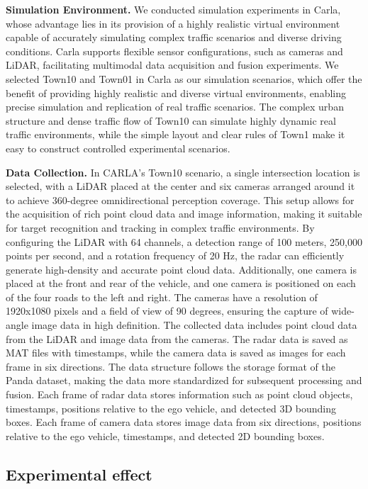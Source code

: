 \textbf{Simulation Environment.}
We conducted simulation experiments in Carla, whose advantage lies in its provision of a highly realistic virtual environment capable of accurately simulating complex traffic scenarios and diverse driving conditions. 
Carla supports flexible sensor configurations, such as cameras and LiDAR, facilitating multimodal data acquisition and fusion experiments\cite{Alpher22e}. 
We selected Town10 and Town01 in Carla as our simulation scenarios, which offer the benefit of providing highly realistic and diverse virtual environments, enabling precise simulation and replication of real traffic scenarios. 
The complex urban structure and dense traffic flow of Town10 can simulate highly dynamic real traffic environments, while the simple layout and clear rules of Town1 make it easy to construct controlled experimental scenarios.

\textbf{Data Collection.}
In CARLA's Town10 scenario, a single intersection location is selected, with a LiDAR placed at the center and six cameras arranged around it to achieve 360-degree omnidirectional perception coverage. 
This setup allows for the acquisition of rich point cloud data and image information, making it suitable for target recognition and tracking in complex traffic environments. 
By configuring the LiDAR with 64 channels, a detection range of 100 meters, 250,000 points per second, and a rotation frequency of 20 Hz, the radar can efficiently generate high-density and accurate point cloud data. 
Additionally, one camera is placed at the front and rear of the vehicle, and one camera is positioned on each of the four roads to the left and right. 
The cameras have a resolution of 1920x1080 pixels and a field of view of 90 degrees, ensuring the capture of wide-angle image data in high definition. 
The collected data includes point cloud data from the LiDAR and image data from the cameras. 
The radar data is saved as MAT files with timestamps, while the camera data is saved as images for each frame in six directions. 
The data structure follows the storage format of the Panda dataset, making the data more standardized for subsequent processing and fusion\cite{Alpher21c}. 
Each frame of radar data stores information such as point cloud objects, timestamps, positions relative to the ego vehicle, and detected 3D bounding boxes. 
Each frame of camera data stores image data from six directions, positions relative to the ego vehicle, timestamps, and detected 2D bounding boxes.

\subsection{Experimental effect}

